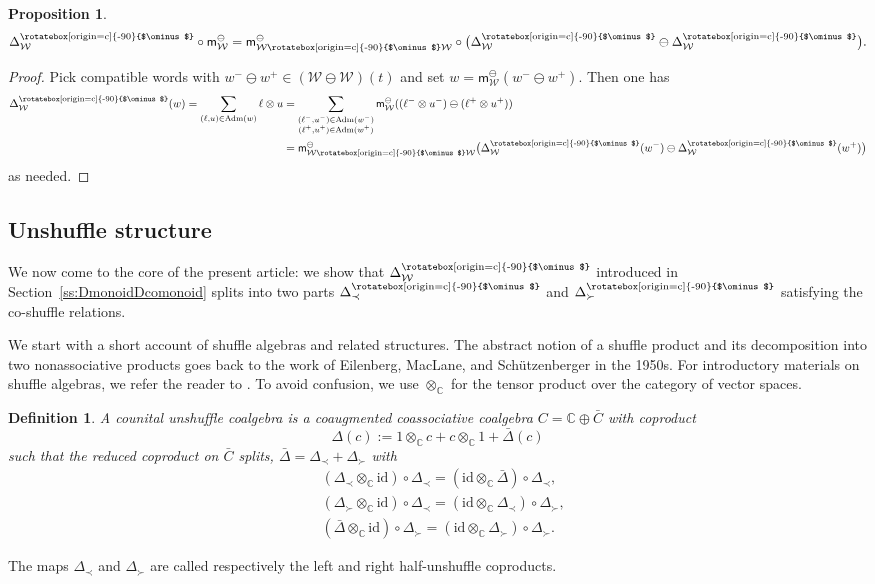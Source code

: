\documentclass[pdftex]{sigma}
\newcommand\overt{\mathbin{\text{\rotatebox[origin=c]{-90}{$\ominus$}}}}
\newcommand\IWc{\mathcal{W}}
\newcommand{\vcp}{\Delta^{\overt}}
\newcommand\vcpS{\vcp_{\IWc}}
\newcommand\mS{\mathsf{m}^{\ominus}_{\IWc}}
\newcommand\mSS{\mathsf{m}^{\ominus}_{\IWc\overt\IWc}}
\def\CC{\mathbb{C}}
\numberwithin{equation}{section}
\newtheorem{Proposition}[Theorem]{Proposition}
\newtheorem{Definition}[Theorem]{Definition}
\begin{document}
\begin{Proposition}	\label{cor:vcpominusmorphism}
	\begin{equation*}
		\vcpS \circ \mS = \mSS\circ\big(\vcpS \ominus \vcpS\big).
	\end{equation*}
\end{Proposition}
\begin{proof} Pick compatible words with $w^-\ominus w^+\in (\IWc\ominus\IWc)(t)$ and set $w=\mS(w^-\ominus w^{+})$. Then one has
	\begin{align*}
		\vcpS(w)=\sum_{(\ell,u) \in {\rm Adm}(w)} \ell \otimes u &= \sum_{\substack{(\ell^{-},u^{-}) \in {\rm Adm}(w^-) \\ (\ell^{+},u^{+}) \in {\rm Adm}(w^{+})}} \mS((\ell^-\otimes u^-) \ominus (\ell^+ \otimes u^+)) \\
		&= \mSS\big(\vcpS(w^{-})\ominus \vcpS(w^{+})\big)
	\end{align*}
	as needed.
\end{proof}

\subsection{Unshuffle structure}
We now come to the core of the present article: we show that $\vcpS$ introduced in Section~\ref{ss:DmonoidDcomonoid} splits into two parts $\vcp_{\prec}$ and $\vcp_{\succ}$ satisfying the co-shuffle relations.

We start with a short account of shuffle algebras and related structures. The abstract notion of a shuffle product and its decomposition into two nonassociative products goes back to the work of Eilenberg, MacLane, and Sch\"utzenberger in the 1950s. For introductory materials on shuffle algebras, we refer the reader to \cite[Section~5]{loday1763dialgebras}. To avoid confusion, we use $\otimes_\CC$ for the tensor product over the category of vector spaces.

\begin{Definition}\label{def:unshuffle}
	A {\it counital unshuffle coalgebra} is a coaugmented coassociative coalgebra $C = \CC\oplus \bar{C}$ with coproduct
	\begin{equation*}
		\Delta(c):= 1 \otimes_{\CC} c + c \otimes_{\CC} 1 + {\bar{\Delta}}(c)
	\end{equation*}
	such that the {\it reduced coproduct}
	on $\bar{C}$ splits, $\bar{\Delta} = \Delta_{\prec} + \Delta_{\succ}$ with
	\begin{align*}
		&(\Delta_{\prec} \otimes_{\CC} \mathrm{id}) \circ \Delta_\prec = (\mathrm{id} \otimes_{\CC} \bar{\Delta})\circ \Delta_{\prec}, \\
		&(\Delta_{\succ} \otimes_{\CC} \mathrm{id}) \circ \Delta_{\prec} = (\mathrm{id} \otimes_{\CC} \Delta_{\prec})\circ \Delta_{\succ}, \\
		&(\bar{\Delta} \otimes_{\CC} \mathrm{id}) \circ \Delta_{\succ} = (\mathrm{id} \otimes_{\CC} \Delta_{\succ})\circ \Delta_{\succ}.
	\end{align*}
\end{Definition}
The maps $\Delta_{\prec}$ and $\Delta_{\succ}$ are called respectively the left and right half-unshuffle coproducts.
\end{document}

